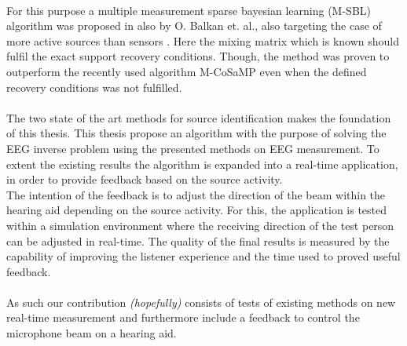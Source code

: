 \\
For this purpose a multiple measurement sparse bayesian learning (M-SBL) algorithm was proposed in \cite{Balkan2014} also by O. Balkan et. al., also targeting the case of more active sources than sensors \cite{Balkan2014}. 
Here the mixing matrix which is known should fulfil the exact support recovery conditions. 
Though, the method was proven to outperform the recently used algorithm M-CoSaMP even when the defined recovery conditions was not fulfilled.  
\\ \\
The two state of the art methods for source identification makes the foundation of this thesis. 
This thesis propose an algorithm with the purpose of solving the EEG inverse problem using the presented methods on EEG measurement. 
To extent the existing results the algorithm is expanded into a real-time application, in order to provide feedback based on the source activity.
\\
The intention of the feedback is to adjust the direction of the beam within the hearing aid depending on the source activity.      
For this, the application is tested within a simulation environment where the receiving direction of the test person can be adjusted in real-time. 
The quality of the final results is measured by the capability of improving the listener experience and the time used to proved useful feedback. 
\\ \\
As such our contribution \textit{(hopefully)} consists of tests of existing methods on new real-time measurement and furthermore include a feedback to control the microphone beam on a hearing aid. 
